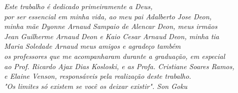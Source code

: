 \begin{dedicatoria}
   \vspace*{\fill}
   \centering
   \noindent

   \textit{Este trabalho é dedicado primeiramente a Deus,\\
   por ser essencial em minha vida, ao meu pai Adalberto Jose Deon, \\
   minha mãe Dyonne Arnaud Sampaio de Alencar Deon, meus irmãos \\
   Jean Guilherme Arnaud Deon e Kaio Cesar Arnaud Deon, minha tia \\
   Maria Soledade Arnaud meus amigos e agradeço também \\
   os professores que me acompanharam durante a graduação, em especial \\
   ao Prof. Ricardo Ajax Dias Kosloski, e as Profa. Cristiane Soares Ramos, \\
   e Elaine Venson, responsáveis pela realização deste trabalho. \\
   "Os limites só existem se você os deixar existir". Son Goku} \vspace*{\fill}
\end{dedicatoria}
